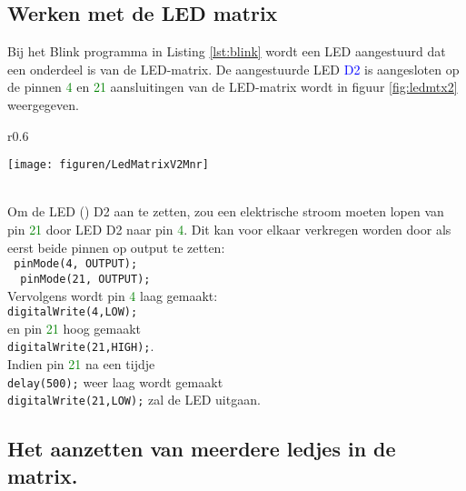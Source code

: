 \subsection{Werken met de LED matrix}

Bij het Blink programma in Listing \ref{lst:blink} wordt een LED aangestuurd dat een onderdeel is van de LED-matrix. De aangestuurde LED \textcolor{blue}{D2} is aangesloten op de pinnen \textcolor{green}{4} en \textcolor{green}{21}  aansluitingen van de LED-matrix wordt in figuur \ref{fig:ledmtx2} weergegeven.


\begin{minipage}{\linewidth}
	\begin{wrapfigure}[23]{r}{0.6\textwidth}
		\vspace{-15pt}
		\begin{center}
			\centering
			\captionsetup{justification=centering}
			\texttt{[image: figuren/LedMatrixV2Mnr]}
		\end{center}
		\caption{Aansluitingen van de LED matrix..}
		\label{fig:ledmtx2}
	\end{wrapfigure}
	
~\vspace{2mm}\\
	Om de LED  () D2 aan te zetten, zou een elektrische stroom moeten lopen van  pin  \textcolor {Green}{21} door LED D2 naar pin \textcolor{Green}{4}.
	Dit kan voor elkaar verkregen worden door als eerst beide pinnen op output te zetten:\\
	\lstinline|	pinMode(4, OUTPUT);|\\ \lstinline|	pinMode(21, OUTPUT);|\\
	Vervolgens wordt pin \textcolor {Green}{4} laag gemaakt:\\
	 \lstinline|digitalWrite(4,LOW);|\\ en pin \textcolor {Green}{21} hoog gemaakt\\ \lstinline|digitalWrite(21,HIGH);|.\\
	 Indien pin \textcolor {Green}{21}  na een tijdje\\ \lstinline|delay(500);| weer laag wordt gemaakt\\ \lstinline|digitalWrite(21,LOW);| zal de LED uitgaan.
\end{minipage}


\subsection{Het aanzetten van meerdere ledjes in de matrix.}\label{sect:mulLED}

